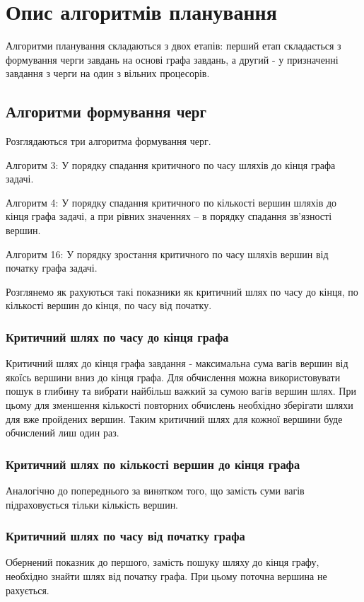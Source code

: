\section{Опис алгоритмів планування}

Алгоритми планування складаються з двох етапів: перший етап складається з формування
черги завдань на основі графа завдань, а другий - у призначенні завдання з черги
на один з вільних процесорів.

\subsection{Алгоритми формування черг}
    Розглядаються три алгоритма формування черг.

    Алгоритм 3:
    У порядку спадання критичного по часу шляхів до кінця графа задачі.

    Алгоритм 4:
    У порядку спадання критичного по кількості вершин шляхів до кінця графа задачі, а при рівних значеннях – в порядку спадання зв’язності вершин.

    Алгоритм 16:
    У порядку зростання критичного по часу шляхів вершин від початку графа задачі.

    Розглянемо як рахуються такі показники як критичний шлях по часу до кінця, по
    кількості вершин до кінця, по часу від початку.

    \subsubsection{Критичний шлях по часу до кінця графа}
    Критичний шлях до кінця графа завдання - максимальна сума вагів вершин
    від якоїсь вершини вниз до кінця графа. Для обчислення можна використовувати пошук в глибину та вибрати
    найбільш важкий за сумою вагів вершин шлях. При цьому для зменшення кількості повторних обчислень необхідно
    зберігати шляхи для вже пройдених вершин. Таким критичний шлях для кожної вершини буде обчислений лиш один раз.

    \subsubsection{Критичний шлях по кількості вершин до кінця графа}
    Аналогічно до попереднього за винятком того, що замість суми вагів підраховується тільки кількість вершин.

    \subsubsection{Критичний шлях по часу від початку графа}
    Обернений показник до першого, замість пошуку шляху до кінця графу, необхідно знайти шлях від початку графа. При цьому
    поточна вершина не рахується.

